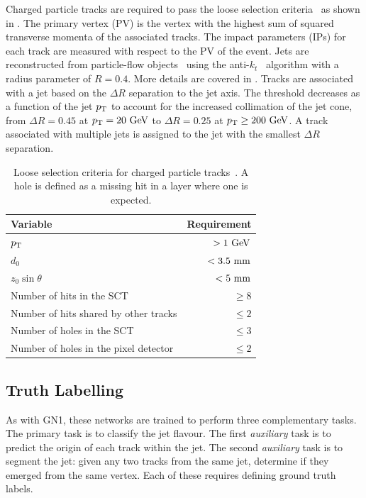 Charged particle tracks are required to pass the loose selection criteria~\cite{DL1D} as shown in .
The primary vertex (PV) is the vertex with the highest sum of squared transverse momenta of the associated tracks.
The impact parameters (IPs) for each track are measured with respect to the PV of the event.
Jets are reconstructed from particle-flow objects~\cite{PFlow} using the anti-$k_t$~\cite{AntiKt} algorithm with a radius parameter of $R = 0.4$.
More details are covered in .
Tracks are associated with a jet based on the $\Delta R$ separation to the jet axis.
The threshold decreases as a function of the jet $p_{\text{T}}$ to account for the increased collimation of the jet cone, from $\Delta R = 0.45$ at $\pt = 20~\GeV$ to $\Delta R = 0.25$ at $\pt \geq 200~\GeV$.
A track associated with multiple jets is assigned to the jet with the smallest $\Delta R$ separation.

\begin{table}
    \centering
    \begin{tabular}{lr}
        \toprule
        Variable & Requirement \\
        \midrule
        $p_{\text{T}}$ & $> 1~\GeV$ \\
        $d_0$ & $< 3.5~\mm$ \\
        $z_0 \sin \theta$ & $< 5~\mm$ \\
        Number of hits in the SCT & $\geq 8$ \\
        Number of hits shared by other tracks & $\leq 2$ \\
        Number of holes in the SCT & $\leq 3$ \\
        Number of holes in the pixel detector & $\leq 2$ \\
        \bottomrule
    \end{tabular}
    \caption{Loose selection criteria for charged particle tracks~\cite{DL1D}. A hole is defined as a missing hit in a layer where one is expected.}
    \label{tab:track_loose}
\end{table}

\subsection{Truth Labelling}

As with GN1, these networks are trained to perform three complementary tasks.
The primary task is to classify the jet flavour.
The first \textit{auxiliary} task is to predict the origin of each track within the jet. The second \textit{auxiliary} task is to segment the jet: given any two tracks from the same jet, determine if they emerged from the same vertex. Each of these requires defining ground truth labels.

